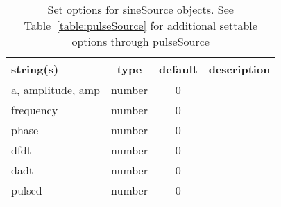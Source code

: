 \begin{table}[ht]
\centering
\begin{tabular}{p{5cm} c c p{7cm}}
\hline
string(s) & type & default & description \\
\hline
a, amplitude, amp & number & 0 & \\
frequency & number & 0 & \\
phase & number & 0 & \\
dfdt & number & 0 & \\
dadt & number & 0 & \\
pulsed & number & 0 & \\
\hline
\end{tabular}
\caption{Set options for sineSource objects. See Table~\ref{table:pulseSource} for additional settable options through pulseSource}
\label{table:sineSource}
\end{table}
